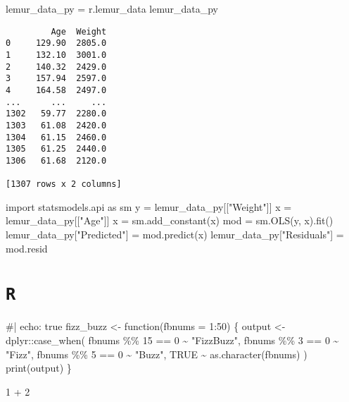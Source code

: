 \documentclass[
  letterpaper,
  DIV=11,
  numbers=noendperiod]{scrreprt}
\newenvironment{Shaded}{\begin{snugshade}}{\end{snugshade}}
\newcommand{\AttributeTok}[1]{\textcolor[rgb]{0.40,0.45,0.13}{#1}}
\newcommand{\CommentTok}[1]{\textcolor[rgb]{0.37,0.37,0.37}{#1}}
\newcommand{\ConstantTok}[1]{\textcolor[rgb]{0.56,0.35,0.01}{#1}}
\newcommand{\ControlFlowTok}[1]{\textcolor[rgb]{0.00,0.23,0.31}{#1}}
\newcommand{\DecValTok}[1]{\textcolor[rgb]{0.68,0.00,0.00}{#1}}
\newcommand{\FunctionTok}[1]{\textcolor[rgb]{0.28,0.35,0.67}{#1}}
\newcommand{\ImportTok}[1]{\textcolor[rgb]{0.00,0.46,0.62}{#1}}
\newcommand{\NormalTok}[1]{\textcolor[rgb]{0.00,0.23,0.31}{#1}}
\newcommand{\OperatorTok}[1]{\textcolor[rgb]{0.37,0.37,0.37}{#1}}
\newcommand{\OtherTok}[1]{\textcolor[rgb]{0.00,0.23,0.31}{#1}}
\newcommand{\SpecialCharTok}[1]{\textcolor[rgb]{0.37,0.37,0.37}{#1}}
\newcommand{\StringTok}[1]{\textcolor[rgb]{0.13,0.47,0.30}{#1}}
\begin{document}
\begin{Shaded}
\begin{Highlighting}[]
\NormalTok{lemur\_data\_py }\OperatorTok{=}\NormalTok{ r.lemur\_data}
\NormalTok{lemur\_data\_py}
\end{Highlighting}
\end{Shaded}

\begin{verbatim}
         Age  Weight
0     129.90  2805.0
1     132.10  3001.0
2     140.32  2429.0
3     157.94  2597.0
4     164.58  2497.0
...      ...     ...
1302   59.77  2280.0
1303   61.08  2420.0
1304   61.15  2460.0
1305   61.25  2440.0
1306   61.68  2120.0

[1307 rows x 2 columns]
\end{verbatim}

\begin{Shaded}
\begin{Highlighting}[]

\ImportTok{import}\NormalTok{ statsmodels.api }\ImportTok{as}\NormalTok{ sm}
\NormalTok{y }\OperatorTok{=}\NormalTok{ lemur\_data\_py[[}\StringTok{"Weight"}\NormalTok{]]}
\NormalTok{x }\OperatorTok{=}\NormalTok{ lemur\_data\_py[[}\StringTok{"Age"}\NormalTok{]]}
\NormalTok{x }\OperatorTok{=}\NormalTok{ sm.add\_constant(x)}
\NormalTok{mod }\OperatorTok{=}\NormalTok{ sm.OLS(y, x).fit()}
\NormalTok{lemur\_data\_py[}\StringTok{"Predicted"}\NormalTok{] }\OperatorTok{=}\NormalTok{ mod.predict(x)}
\NormalTok{lemur\_data\_py[}\StringTok{"Residuals"}\NormalTok{] }\OperatorTok{=}\NormalTok{ mod.resid}
\end{Highlighting}
\end{Shaded}

\section{\texorpdfstring{\texttt{R}}{R}}

\begin{Shaded}
\begin{Highlighting}[]
\CommentTok{\#| echo: true}
\NormalTok{fizz\_buzz }\OtherTok{\textless{}{-}} \ControlFlowTok{function}\NormalTok{(}\AttributeTok{fbnums =} \DecValTok{1}\SpecialCharTok{:}\DecValTok{50}\NormalTok{) \{}
\NormalTok{  output }\OtherTok{\textless{}{-}}\NormalTok{ dplyr}\SpecialCharTok{::}\FunctionTok{case\_when}\NormalTok{(}
\NormalTok{    fbnums }\SpecialCharTok{\%\%} \DecValTok{15} \SpecialCharTok{==} \DecValTok{0} \SpecialCharTok{\textasciitilde{}} \StringTok{"FizzBuzz"}\NormalTok{,}
\NormalTok{    fbnums }\SpecialCharTok{\%\%} \DecValTok{3} \SpecialCharTok{==} \DecValTok{0} \SpecialCharTok{\textasciitilde{}} \StringTok{"Fizz"}\NormalTok{,}
\NormalTok{    fbnums }\SpecialCharTok{\%\%} \DecValTok{5} \SpecialCharTok{==} \DecValTok{0} \SpecialCharTok{\textasciitilde{}} \StringTok{"Buzz"}\NormalTok{,}
    \ConstantTok{TRUE} \SpecialCharTok{\textasciitilde{}} \FunctionTok{as.character}\NormalTok{(fbnums)}
\NormalTok{  )}
  \FunctionTok{print}\NormalTok{(output)}
\NormalTok{\}}

\DecValTok{1} \SpecialCharTok{+} \DecValTok{2}
\end{Highlighting}
\end{Shaded}
\end{document}
